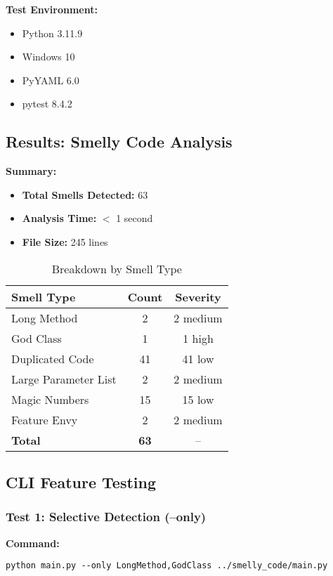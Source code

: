 \documentclass[11pt,a4paper]{article}
\begin{document}
\textbf{Test Environment:}
\begin{itemize}[noitemsep]
    \item Python 3.11.9
    \item Windows 10
    \item PyYAML 6.0
    \item pytest 8.4.2
\end{itemize}

\subsection{Results: Smelly Code Analysis}

\textbf{Summary:}
\begin{itemize}[noitemsep]
    \item \textbf{Total Smells Detected:} 63
    \item \textbf{Analysis Time:} $<$ 1 second
    \item \textbf{File Size:} 245 lines
\end{itemize}

\begin{table}[h]
\centering
\caption{Breakdown by Smell Type}
\begin{tabular}{@{}lcc@{}}
\toprule
\textbf{Smell Type} & \textbf{Count} & \textbf{Severity} \\
\midrule
Long Method & 2 & 2 medium \\
God Class & 1 & 1 high \\
Duplicated Code & 41 & 41 low \\
Large Parameter List & 2 & 2 medium \\
Magic Numbers & 15 & 15 low \\
Feature Envy & 2 & 2 medium \\
\midrule
\textbf{Total} & \textbf{63} & -- \\
\bottomrule
\end{tabular}
\end{table}

\subsection{CLI Feature Testing}

\subsubsection{Test 1: Selective Detection (--only)}

\textbf{Command:}
\begin{verbatim}
python main.py --only LongMethod,GodClass ../smelly_code/main.py
\end{verbatim}
\end{document}
